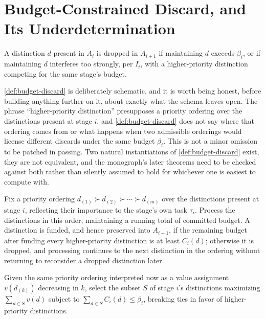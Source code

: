 \section{Budget-Constrained Discard, and Its Underdetermination}

\begin{definition}
\label{def:budget-discard}
A distinction $d$ present in $A_i$ is dropped in $A_{i+1}$ if maintaining
$d$ exceeds $\beta_i$, or if maintaining $d$ interferes too strongly, per
$I_i$, with a higher-priority distinction competing for the same stage's
budget.
\end{definition}

\cref{def:budget-discard} is deliberately schematic, and it is worth being
honest, before building anything further on it, about exactly what the
schema leaves open. The phrase ``higher-priority distinction'' presupposes
a priority ordering over the distinctions present at stage $i$, and
\cref{def:budget-discard} does not say where that ordering comes from or
what happens when two admissible orderings would license different
discards under the same budget $\beta_i$. This is not a minor omission to
be patched in passing. Two natural instantiations of
\cref{def:budget-discard} exist, they are not equivalent, and the
monograph's later theorems need to be checked against both rather than
silently assumed to hold for whichever one is easiest to compute with.

\begin{construction}
\label{con:greedy-discard}
Fix a priority ordering $d_{(1)} \succ d_{(2)} \succ \cdots \succ d_{(m)}$
over the distinctions present at stage $i$, reflecting their importance to
the stage's own task $\tau_i$. Process the distinctions in this order,
maintaining a running total of committed budget. A distinction is funded,
and hence preserved into $A_{i+1}$, if the remaining budget after funding
every higher-priority distinction is at least $C_i(d)$; otherwise it is
dropped, and processing continues to the next distinction in the ordering
without returning to reconsider a dropped distinction later.
\end{construction}

\begin{construction}
\label{con:optimal-discard}
Given the same priority ordering interpreted now as a value assignment
$v(d_{(k)})$ decreasing in $k$, select the subset $S$ of stage $i$'s
distinctions maximizing $\sum_{d \in S} v(d)$ subject to $\sum_{d \in S}
C_i(d) \le \beta_i$, breaking ties in favor of higher-priority
distinctions.
\end{construction}

